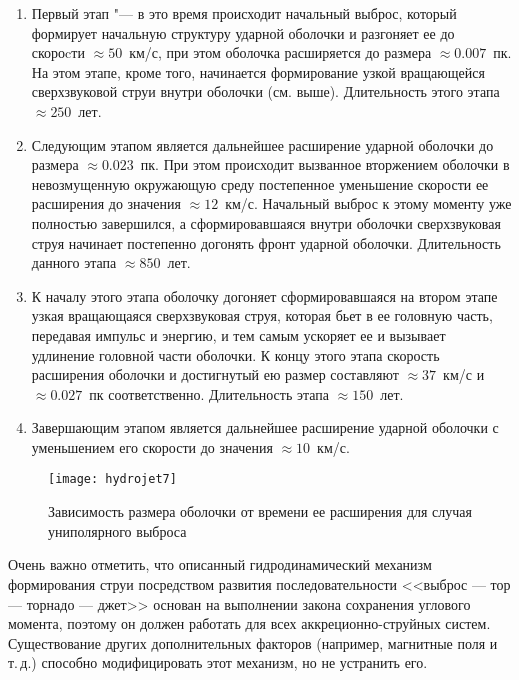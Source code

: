 \begin{enumerate}
\item Первый этап "--- в это время происходит начальный выброс, который
формирует начальную структуру ударной оболочки и разгоняет ее до
скороcти ${\approx 50}$~км/с, при этом оболочка расширяется до размера
${\approx 0.007}$~пк. На этом этапе, кроме того, начинается формирование
узкой вращающейся сверхзвуковой струи внутри оболочки (см. выше).
Длительность этого этапа ${\approx 250}$~лет.

\item Следующим этапом является дальнейшее расширение ударной оболочки
до размера ${\approx 0.023}$~пк. При этом происходит вызванное вторжением
оболочки в невозмущенную окружающую среду постепенное уменьшение скорости
ее расширения до значения ${\approx 12}$~км/с. Начальный выброс
к этому моменту уже полностью завершился, а сформировавшаяся внутри
оболочки сверхзвуковая струя начинает постепенно догонять фронт
ударной оболочки. Длительность данного этапа ${\approx 850}$~лет.

\item К началу этого этапа оболочку догоняет сформировавшаяся на втором
этапе узкая вращающаяся сверхзвуковая струя, которая бьет в ее головную
часть, передавая импульс и энергию, и тем самым ускоряет ее
и вызывает удлинение головной части оболочки. К концу этого этапа
скорость расширения оболочки и достигнутый ею размер составляют
${\approx 37}$~км/с и ${\approx 0.027}$~пк соответственно. Длительность
этапа ${\approx 150}$~лет.

\item Завершающим этапом является дальнейшее расширение ударной
оболочки с уменьшением его скорости до значения ${\approx 10}$~км/с.
\end{enumerate}

\begin{figure}[!h]
\centering
\texttt{[image: hydrojet7]}
\caption{Зависимость размера оболочки от времени ее расширения для случая\plb
униполярного выброса}
\label{fig:kmx:rt}
\end{figure}

Очень важно отметить, что описанный гидродинамический механизм
формирования струи посредством развития последовательности
<<выброс --- тор --- торнадо --- джет>> основан на выполнении закона сохранения
углового момента, поэтому он должен работать для всех
аккреционно-струйных систем. Существование других дополнительных
факторов (например, магнитные поля и т.\,д.) способно
модифицировать этот механизм, но не устранить его.


